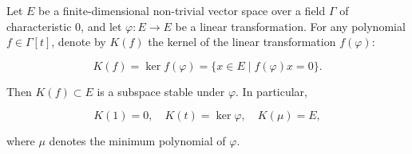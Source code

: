 Let $E$ be a finite-dimensional non-trivial vector space over a field $\Gamma$ of characteristic $0$, and let $\varphi: E \to E$ be a linear transformation. For any polynomial $f \in \Gamma[t]$, denote by $K(f)$ the kernel of the linear transformation $f(\varphi)$:

$$K(f) = \ker f(\varphi) = \{ x \in E \mid f(\varphi)x = 0 \}.$$

Then $K(f) \subset E$ is a subspace stable under $\varphi$. In particular,

$$K(1) = 0, \quad K(t) = \ker \varphi, \quad K(\mu) = E,$$

where $\mu$ denotes the minimum polynomial of $\varphi$.
